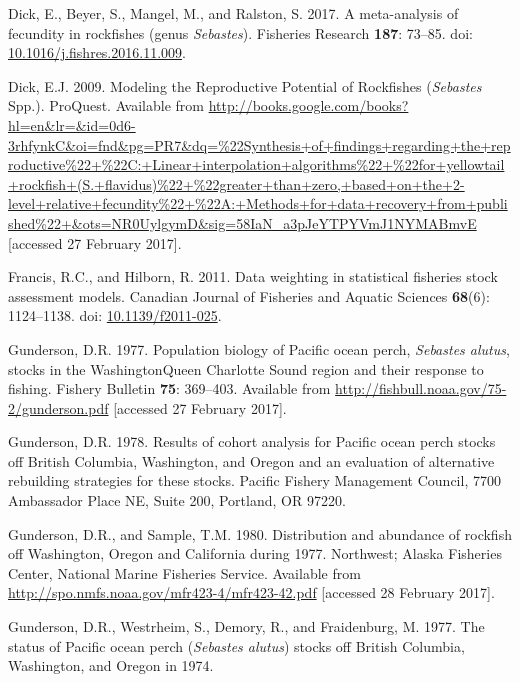 \documentclass[12pt,]{article}
\begin{document}
\hypertarget{ref-dick_meta-analysis_2017}{}
Dick, E., Beyer, S., Mangel, M., and Ralston, S. 2017. A meta-analysis
of fecundity in rockfishes (genus \emph{Sebastes}). Fisheries Research
\textbf{187}: 73--85. doi:
\href{https://doi.org/10.1016/j.fishres.2016.11.009}{10.1016/j.fishres.2016.11.009}.

\hypertarget{ref-dick_modeling_2009}{}
Dick, E.J. 2009. Modeling the Reproductive Potential of Rockfishes
(\emph{Sebastes} Spp.). ProQuest. Available from
\url{http://books.google.com/books?hl=en\&lr=\&id=0d6-3rhfynkC\&oi=fnd\&pg=PR7\&dq=\%22Synthesis+of+findings+regarding+the+reproductive\%22+\%22C:+Linear+interpolation+algorithms\%22+\%22for+yellowtail+rockfish+(S.+flavidus)\%22+\%22greater+than+zero,+based+on+the+2-level+relative+fecundity\%22+\%22A:+Methods+for+data+recovery+from+published\%22+\&ots=NR0UylgymD\&sig=58IaN_a3pJeYTPYVmJ1NYMABmvE}
{[}accessed 27 February 2017{]}.

\hypertarget{ref-francis_data_2011}{}
Francis, R.C., and Hilborn, R. 2011. Data weighting in statistical
fisheries stock assessment models. Canadian Journal of Fisheries and
Aquatic Sciences \textbf{68}(6): 1124--1138. doi:
\href{https://doi.org/10.1139/f2011-025}{10.1139/f2011-025}.

\hypertarget{ref-gunderson_population_1977}{}
Gunderson, D.R. 1977. Population biology of Pacific ocean perch,
\emph{Sebastes alutus}, stocks in the WashingtonQueen Charlotte Sound
region and their response to fishing. Fishery Bulletin \textbf{75}:
369--403. Available from
\url{http://fishbull.noaa.gov/75-2/gunderson.pdf} {[}accessed 27
February 2017{]}.

\hypertarget{ref-gunderson_results_1978}{}
Gunderson, D.R. 1978. Results of cohort analysis for Pacific ocean perch
stocks off British Columbia, Washington, and Oregon and an evaluation of
alternative rebuilding strategies for these stocks. Pacific Fishery
Management Council, 7700 Ambassador Place NE, Suite 200, Portland, OR
97220.

\hypertarget{ref-gunderson_distribution_1980}{}
Gunderson, D.R., and Sample, T.M. 1980. Distribution and abundance of
rockfish off Washington, Oregon and California during 1977. Northwest;
Alaska Fisheries Center, National Marine Fisheries Service. Available
from \url{http://spo.nmfs.noaa.gov/mfr423-4/mfr423-42.pdf} {[}accessed
28 February 2017{]}.

\hypertarget{ref-gunderson_status_1977}{}
Gunderson, D.R., Westrheim, S., Demory, R., and Fraidenburg, M. 1977.
The status of Pacific ocean perch (\emph{Sebastes alutus}) stocks off
British Columbia, Washington, and Oregon in 1974.
\end{document}
